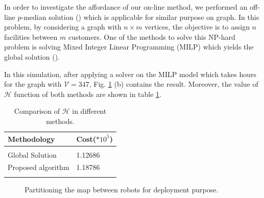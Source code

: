 \documentclass[twocolumn]{svjour3}       %
\begin{document}
In order to investigate the affordance of our on-line method, we performed an off-line $p$-median solution (\cite{Daskin2015}) which is applicable for similar purpose on graph. In this problem, by considering a graph with $n \times m$ vertices, the objective is to assign $n$ facilities between $m$ customers. One of the methods to solve this NP-hard problem is solving Mixed Integer Linear Programming (MILP) which yields the global solution (\cite{Edson2005}).

In this simulation, after applying a solver on the MILP model which takes hours for the graph with $\mathcal{V}=347$, Fig. \ref{fig:googledeployed} (b) contains the result. Moreover, the value of $\mathcal{H}$ function of both methods are shown in table \ref{tbl:comparison}.

\begin{table}[t]
\centering
\caption{Comparison of $\mathcal{H}$ in different methods. }
\label{tbl:comparison}
\begin{tabular}{m{3cm}m{1.2cm}}
Methodology    & Cost($*10^5$)    \\
 \hline\\
 Global Solution   &  1.12686  \\
Proposed algorithm & 1.18786  \\
\hline\\
\end{tabular}
\end{table}

\begin{figure}[h]
	\centering	
	\caption{Partitioning the map between robots for deployment purpose.}
	\label{fig:googledeployed}
\end{figure}
\end{document}
